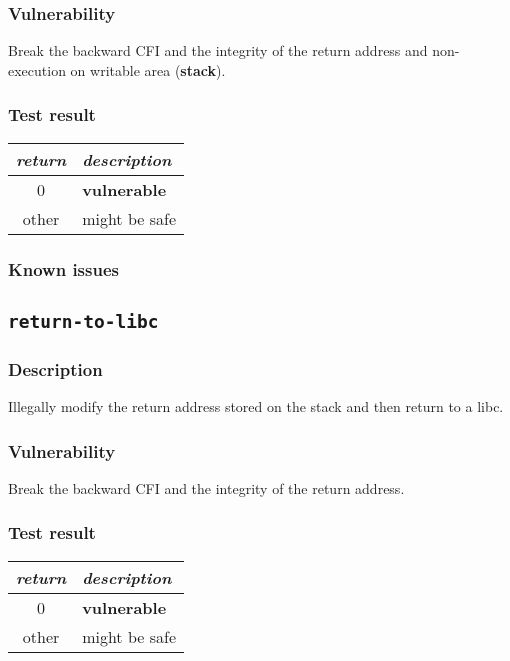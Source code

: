 \documentclass[a4paper]{book}
\begin{document}
\subsubsection{Vulnerability}
Break the backward CFI and the integrity of the return address and non-execution on writable area (\textbf{stack}).

\subsubsection{Test result}
\begin{tabular}{cl}
  \toprule
  \emph{return}  & \emph{description} \\
  \midrule
  0              & \textbf{vulnerable} \\
  other          & might be safe \\
  \bottomrule
\end{tabular}
  
\subsubsection{Known issues}
\newpage
\subsection{\texttt{return-to-libc}}\label{test-return-to-libc}

\subsubsection{Description}
Illegally modify the return address stored on the stack and then return to a libc.

\subsubsection{Vulnerability}
Break the backward CFI and the integrity of the return address.

\subsubsection{Test result}
\begin{tabular}{cl}
  \toprule
  \emph{return}  & \emph{description} \\
  \midrule
  0              & \textbf{vulnerable} \\
  other          & might be safe \\
  \bottomrule
\end{tabular}
  
\end{document}
